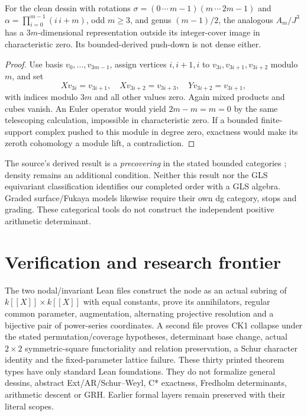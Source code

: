 \begin{corollary}\label{cover:higher}
For the clean dessin with rotations
$\sigma=(0\,\cdots\,m-1)(m\,\cdots\,2m-1)$ and
$\alpha=\prod_{i=0}^{m-1}(i\,i+m)$, odd $m\geq3$, and genus $(m-1)/2$,
the analogous $A_m/J^3$ has a $3m$-dimensional representation
outside its integer-cover image in characteristic zero. Its bounded-derived
push-down is not dense either.
\end{corollary}
\begin{proof}
Use basis $v_0,\ldots,v_{3m-1}$, assign vertices $i,i+1,i$ to
$v_{3i},v_{3i+1},v_{3i+2}$ modulo $m$, and set
\[
 Xv_{3i}=v_{3i+1},\quad Xv_{3i+2}=v_{3i+3},\quad
 Yv_{3i+2}=v_{3i+1},
\]
with indices modulo $3m$ and all other values zero. Again mixed products
and cubes vanish. An Euler operator would yield $2m-m=m=0$ by the same
telescoping calculation, impossible in characteristic zero. If a bounded
finite-support complex pushed to this module in degree zero, exactness would
make its zeroth cohomology a module lift, a contradiction.
\end{proof}

The source's derived result is a \emph{precovering} in the stated bounded
categories \cite[Theorem~4.28]{CoveringLecture2026}; density remains an
additional condition. Neither this result nor the GLS equivariant
classification \cite{TameGLS2026} identifies our completed order with a GLS
algebra. Graded surface/Fukaya models \cite{SchrollGeometric2026} likewise
require their own dg category, stops and grading. These categorical tools
do not construct the independent positive arithmetic determinant.



\chapter{Verification and research frontier}
The two nodal/invariant Lean files construct the node as an actual subring of $k[[X]]\times k[[X]]$ with equal constants, prove its annihilators, regular common parameter, augmentation, alternating projective resolution and a bijective pair of power-series coordinates. A second file proves CK1 collapse under the stated permutation/coverage hypotheses, determinant base change, actual $2\times2$ symmetric-square functoriality and relation preservation, a Schur character identity and the fixed-parameter lattice failure. These thirty printed theorem types have only standard Lean foundations. They do not formalize general dessins, abstract Ext/AR/Schur--Weyl, C* exactness, Fredholm determinants, arithmetic descent or GRH. Earlier formal layers remain preserved with their literal scopes.

